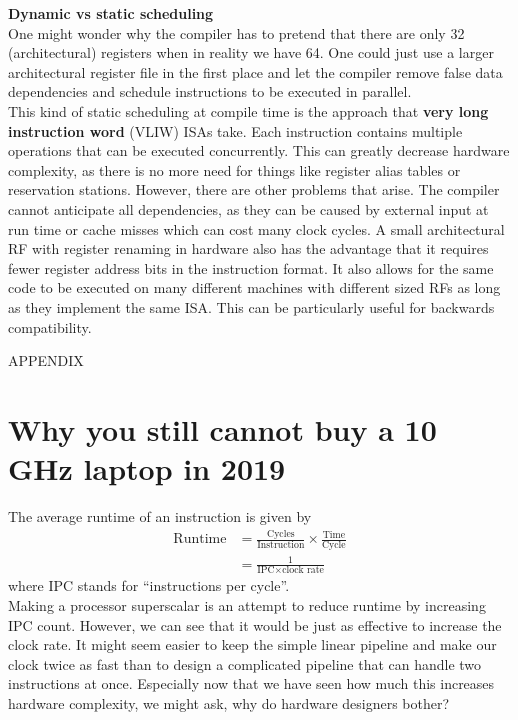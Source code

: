 \documentclass[12pt,a4paper]{article} %
\begin{document}
\textbf{Dynamic vs static scheduling}\\
	One might wonder why the compiler has to pretend that there are only 32 (architectural) registers when in reality we have 64. One could just use a larger architectural register file in the first place and let the compiler remove false data dependencies and schedule instructions to be executed in parallel. \\
	This kind of static scheduling at compile time is the approach that \textbf{very long instruction word} (VLIW) ISAs take. Each instruction contains multiple operations that can be executed concurrently. This can greatly decrease hardware complexity, as there is no more need for things like register alias tables or reservation stations. However, there are other problems that arise. The compiler cannot anticipate all dependencies, as they can be caused by external input at run time or cache misses which can cost many clock cycles. A small architectural RF with register renaming in hardware also has the advantage that it requires fewer register address bits in the instruction format. It also allows for the same code to be executed on many different machines with different sized RFs as long as they implement the same ISA. This can be particularly useful for backwards compatibility. \cite[p.~192-196]{Hennessy} \\
	
	

\newpage
\vspace{10cm}
\begin{center}
	\vspace{10cm}
	{\LARGE APPENDIX}
\end{center}
\newpage

\appendix
\setcounter{secnumdepth}{0}

\section{Why you still cannot buy a 10 GHz laptop in 2019} \label{sec-physicallimits}
\vspace{0.5cm}
The average runtime of an instruction is given by
\begin{equation}
\begin{aligned}
\text{Runtime} 
&= \frac{\text{Cycles}}{\text{Instruction}} \times \frac{\text{Time}}{\text{Cycle}}\\
&= \frac{1}{\text{IPC} \times \text{clock rate}} 
\end{aligned}
\end{equation}
where IPC stands for ``instructions per cycle''.\\
Making a processor superscalar is an attempt to reduce runtime by increasing IPC count. However, we can see that it would be just as effective to increase the clock rate. It might seem easier to keep the simple linear pipeline and make our clock twice as fast than to design a complicated pipeline that can handle two instructions at once. Especially now that we have seen how much this increases hardware complexity, we might ask, why do hardware designers bother?\\
\end{document}
